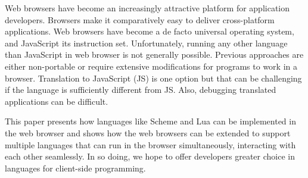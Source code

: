 Web browsers have become an increasingly attractive platform for application developers. Browsers make it comparatively easy to deliver cross-platform applications. Web browsers have become a de facto universal operating system, and JavaScript its instruction set. Unfortunately, running any other language than JavaScript in web browser is not generally possible. Previous approaches are either non-portable or require extensive modifications for programs to work in a browser. Translation to JavaScript (JS) is one option but that can be challenging if the language is sufficiently different from JS. Also, debugging translated applications can be difficult.

This paper presents how languages like Scheme and Lua can be implemented in the web browser and shows how the web browsers can be extended to support multiple languages that can run in the browser simultaneously, interacting with each other seamlessly. In so doing, we hope to offer developers greater choice in languages for client-side programming.

